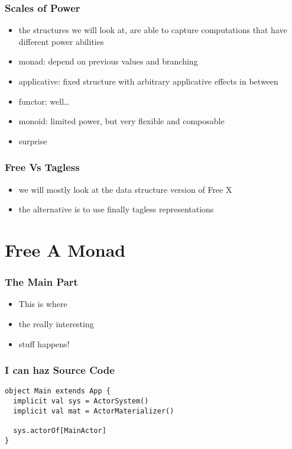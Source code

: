 \documentclass{beamer}
\begin{document}
\begin{frame}
  \frametitle{Scales of Power}
  \begin{itemize}
  \item the structures we will look at, are able to capture computations that have different power abilities
  \item monad: depend on previous values and branching
  \item applicative: fixed structure with arbitrary applicative effects in between
  \item functor: well\ldots
  \item monoid: limited power, but very flexible and composable
  \item surprise
  \end{itemize}
\end{frame}

\begin{frame}
  \frametitle{Free Vs Tagless}
  \begin{itemize}
  \item we will mostly look at the data structure version of Free X
  \item the alternative is to use finally tagless representations
  \end{itemize}
\end{frame}

\section{Free A Monad}\label{sec:main-part}
\begin{frame}
  \frametitle{The Main Part}
  \begin{itemize}
  \item This is where
  \item the really interesting
  \item stuff happens!
  \end{itemize}
\end{frame}

\begin{frame}[fragile]
  \frametitle{I can haz Source Code}
  \begin{center}
\begin{verbatim}
object Main extends App {
  implicit val sys = ActorSystem()
  implicit val mat = ActorMaterializer()

  sys.actorOf[MainActor]
}
\end{verbatim}
  \end{center}
\end{frame}
\end{document}
